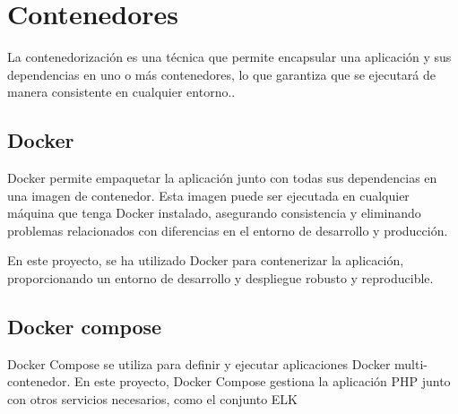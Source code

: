 \section*{Contenedores}
La contenedorización es una técnica que permite encapsular una aplicación y sus dependencias en uno o más contenedores, lo que garantiza que se ejecutará de manera consistente en cualquier entorno..

\subsection*{Docker}
Docker permite empaquetar la aplicación junto con todas sus dependencias en una imagen de contenedor. Esta imagen puede ser ejecutada en cualquier máquina que tenga Docker instalado, asegurando consistencia y eliminando problemas relacionados con diferencias en el entorno de desarrollo y producción.

En este proyecto, se ha utilizado Docker para contenerizar la aplicación, proporcionando un entorno de desarrollo y despliegue robusto y reproducible.

\subsection*{Docker compose}
Docker Compose se utiliza para definir y ejecutar aplicaciones Docker multi-contenedor. En este proyecto, Docker Compose gestiona la aplicación PHP junto con otros servicios necesarios, como el conjunto ELK
